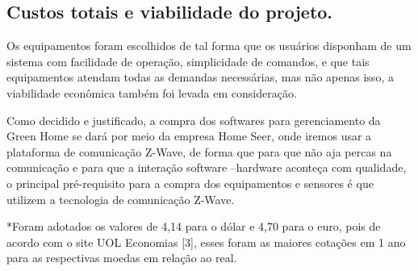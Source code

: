 \subsection{Custos totais e viabilidade do projeto.}

	Os equipamentos foram escolhidos de tal forma que os usuários disponham de um sistema com facilidade de operação, simplicidade de comandos, e que tais equipamentos atendam todas as demandas necessárias, mas não apenas isso, a viabilidade econômica também foi levada em consideração.
	
	Como decidido e justificado, a compra dos softwares para gerenciamento da Green Home se dará por meio da empresa Home Seer, onde iremos usar a plataforma de comunicação Z-Wave, de forma que para que não aja percas na comunicação e para que a interação software –hardware aconteça com qualidade, o principal pré-requisito para a compra dos equipamentos e sensores é que utilizem a tecnologia de comunicação Z-Wave.


*Foram adotados os valores de 4,14 para o dólar e 4,70 para o euro, pois de acordo com o site UOL Economias [3], esses foram as maiores cotações em 1 ano para as respectivas moedas em relação ao real. 



